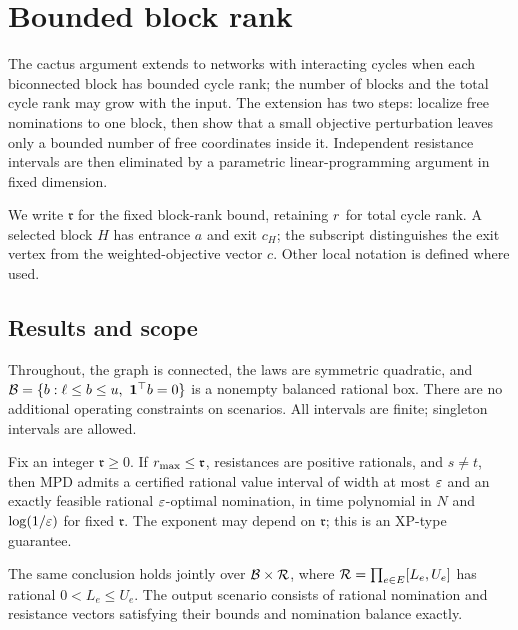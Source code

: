 \section{Bounded block rank}
\label{sec:a-block-rank}

The cactus argument extends to networks with interacting cycles when
each biconnected block has bounded cycle rank; the number of blocks and
the total cycle rank may grow with the input. The extension has two
steps: localize free nominations to one block, then show that a small
objective perturbation leaves only a bounded number of free coordinates
inside it. Independent resistance intervals are then eliminated by a
parametric linear-programming argument in fixed dimension.

We write $\mathfrak r$ for the fixed block-rank bound, retaining
$r$ for total cycle rank. A selected block $H$ has entrance $a$
and exit $c_H$; the subscript distinguishes the exit vertex from the
weighted-objective vector $c$. Other local notation is defined where used.

\subsection{Results and scope}
Throughout, the graph is connected, the laws are symmetric quadratic,
and $\mathcal{B}=\{b:\ell\le b\le u,\ \mathbf{1}^\top b=0\}$ is a nonempty
balanced rational box. There are no additional operating constraints
on scenarios. All intervals are finite; singleton intervals are allowed.

\begin{theorem}
\label{thm:a-blk-nomination}
Fix an integer $\mathfrak r\ge0$. If $r_{\max}\le\mathfrak r$,
resistances are positive rationals, and $s\ne t$, then MPD admits a
certified rational value interval of width at most $\varepsilon$ and an
exactly feasible rational $\varepsilon$-optimal nomination, in time polynomial
in $N$ and $\log(1/\varepsilon)$ for fixed $\mathfrak r$.
The exponent may depend on $\mathfrak r$; this is an XP-type guarantee.
\end{theorem}

\begin{theorem}
\label{thm:a-blk-joint}
The same conclusion holds jointly over
$\mathcal{B}\times\mathcal{R}$, where
$\mathcal{R}=\prod_{e\in E}[L_e,U_e]$ has rational $0<L_e\le U_e$.
The output scenario consists of rational nomination and resistance
vectors satisfying their bounds and nomination balance exactly.
\end{theorem}

